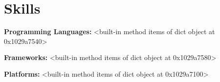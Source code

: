 \section{Skills}

    \begin{onecolentry}
        \textbf{Programming Languages:} <built-in method items of dict object at 0x1029a7540>
    \end{onecolentry}

    \vspace{0.05 cm}

    \begin{onecolentry}
        \textbf{Frameworks:} <built-in method items of dict object at 0x1029a7580>
    \end{onecolentry}

    \vspace{0.05 cm}

    \begin{onecolentry}
        \textbf{Platforms:} <built-in method items of dict object at 0x1029a7100>
    \end{onecolentry}

    \vspace{0.05 cm}

